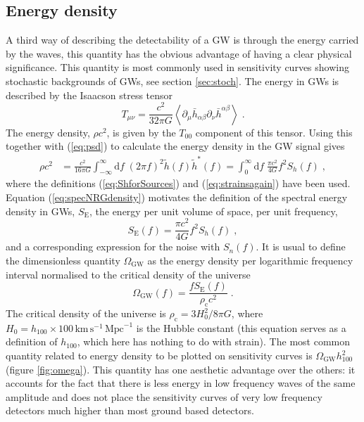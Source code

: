 \subsection{Energy density}
A third way of describing the detectability of a GW is through the energy carried by the waves, this quantity has the obvious advantage of having a clear physical significance. This quantity is most commonly used in sensitivity curves showing stochastic backgrounds of GWs, see section \ref{sec:stoch}. The energy in GWs is described by the Isaacson stress tensor \citep{MTW}
\begin{equation} T_{\mu\nu}=\frac{c^{2}}{32\pi G}\left<\partial_{\mu}\bar{h}_{\alpha\beta}\partial_{\nu}\bar{h}^{\alpha\beta}\right> \;.\end{equation}
The energy density, $\rho c^{2}$, is given by the $T_{00}$ component of this tensor. Using this together with (\ref{eq:psd}) to calculate the energy density in the GW signal gives
\begin{eqnarray}\label{eq:specNRGdensity}
\rho c^{2}&=\frac{c^{2}}{16\pi G}\int_{-\infty}^{\infty}\textrm{d}f\;\left(2\pi f\right)^{2}\tilde{h}(f)\tilde{h}^{*}(f)=\int_{0}^{\infty}\textrm{d}f\;\frac{\pi c^{2}}{4G}f^{2}S_{h}(f)\; ,
\end{eqnarray} 
where the definitions (\ref{eq:ShforSources}) and (\ref{eq:strainsagain}) have been used. Equation (\ref{eq:specNRGdensity}) motivates the definition of the spectral energy density in GWs, $S_{\textrm{E}}$, the energy per unit volume of space, per unit frequency, \cite{HellingsDowns}
\begin{equation}\label{eq:spectralenergydensity} S_{\textrm{E}}(f)=\frac{\pi c^{2}}{4G} f^{2}S_{h}(f) \; ,\end{equation}
and a corresponding expression for the noise with $S_{n}(f)$. It is usual to define the dimensionless quantity $\Omega_{\textrm{GW}}$ as the energy density per logarithmic frequency interval normalised to the critical density of the universe
\begin{equation}\label{eq:omega} \Omega_{\textrm{GW}}(f)=\frac{fS_{\textrm{E}}(f)}{\rho_{\textrm{c}}c^{2}}\; . \end{equation}
The critical density of the universe is $\rho_{\textrm{c}}=3H_{0}^{2}/8\pi G$, where $H_{0}=h_{100}\times 100\, \textrm{km}\,\textrm{s}^{-1}\,\textrm{Mpc}^{-1}$ is the Hubble constant (this equation serves as a definition of $h_{100}$, which here has nothing to do with strain). The most common quantity related to energy density to be plotted on sensitivity curves is $\Omega_{\textrm{GW}}h_{100}^{2}$ (figure \ref{fig:omega}). This quantity has one aesthetic advantage over the others: it accounts for the fact that there is less energy in low frequency waves of the same amplitude and does not place the sensitivity curves of very low frequency detectors much higher than most ground based detectors.



